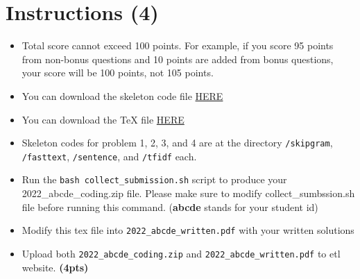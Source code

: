 \documentclass{assignment format}
\begin{document}
\begin{center}

\end{center}
\def\showanswers{1}

\section{Instructions (4)}
\begin{itemize}
\item Total score cannot exceed 100 points. For example, if you score 95 points from non-bonus questions and 10 points are added from bonus questions, your score will be 100 points, not 105 points.
\item You can download the skeleton code file \href{https://raw.githubusercontent.com/yc-song/gsds-nlp-assignment-1/main/a1.zip}{HERE} 
\item You can download the TeX file \href{https://raw.githubusercontent.com/yc-song/gsds-nlp-assignment-1/main/a1(tex).zip}{HERE} 
\item Skeleton codes for problem 1, 2, 3, and 4 are at the directory \texttt{/skipgram}, \texttt{/fasttext}, \texttt{/sentence}, and \texttt{/tfidf} each. 
\item Run the \texttt{bash collect\_submission.sh} script to produce your 2022\_abcde\_coding.zip file. Please make sure to modify collect\_sumbssion.sh file before running this command. (\textbf{abcde} stands for your student id)
\item Modify this tex file into \texttt{2022\_abcde\_written.pdf} with your written solutions
\item Upload both \texttt{2022\_abcde\_coding.zip} and \texttt{2022\_abcde\_written.pdf} to etl website. \textbf{(4pts)}
\end{itemize}



\end{document}
